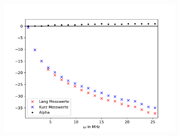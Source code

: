 \begin{figure}[h]
	\centering
	\includegraphics[width=0.8\textwidth]{Daempfung/build/Plot.pdf}
	\caption{}
	\label{fig:PlotDaempfung}
\end{figure}\clearpage
